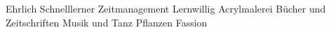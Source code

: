 

\begin{cvskills}
 {
  Ehrlich \mitdiv Schnelllerner \mitdiv Zeitmanagement \mitdiv Lernwillig
}
 {
  Acrylmalerei \mitdiv Bücher und Zeitschriften \mitdiv Musik und Tanz
}
 {
  Pflanzen \mitdiv Fassion
}
\end{cvskills}
